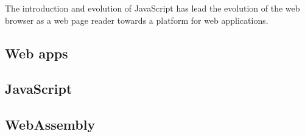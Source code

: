 The introduction and evolution of JavaScript has lead the evolution of the web browser as a web page reader towards a platform for web applications.

\subsection{Web apps}


\subsection{JavaScript}


\subsection{WebAssembly}


